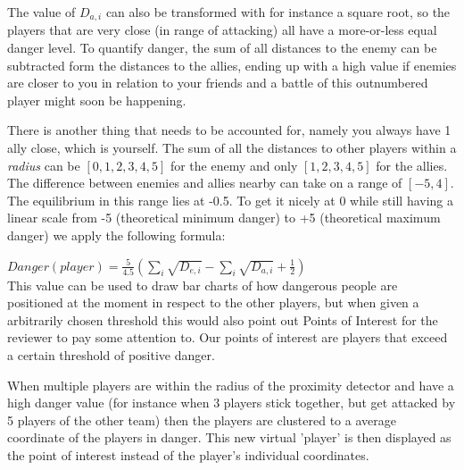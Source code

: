 \documentclass[a4paper]{article}
\theoremstyle{plain} %
\theoremstyle{definition} %
\begin{document}
The value of $D_{a,i}$ can also be transformed with for instance a square root, so the players that are very close (in range of attacking) all have a more-or-less equal danger level. To quantify danger, the sum of all distances to the enemy can be subtracted form the distances to the allies, ending up with a high value if enemies are closer to you in relation to your friends and a battle of this outnumbered player might soon be happening.

There is another thing that needs to be accounted for, namely you always have 1 ally close, which is yourself. The sum of all the distances to other players  within a \emph{radius} can be $[0,1,2,3,4,5]$ for the enemy and only $[1,2,3,4,5]$ for the allies. The difference between enemies and allies nearby can take on a range of $[-5,4]$. The equilibrium in this range lies at -0.5. To get it nicely at 0 while still having a linear scale from -5 (theoretical minimum danger) to +5 (theoretical maximum danger) we apply the following formula:

$Danger(player) = \frac{5}{4.5}(\sum_i{\sqrt{D_{e,i}}}-\sum_i{\sqrt{D_{a,i}}}+\frac{1}{2})$\\

This value can be used to draw bar charts of how dangerous people are positioned at the moment in respect to the other players, but when given a arbitrarily chosen threshold this would also point out Points of Interest for the reviewer to pay some attention to. Our points of interest are players that exceed a certain threshold of positive danger. 

When multiple players are within the radius of the proximity detector and have a high danger value (for instance when 3 players stick together, but get attacked by 5 players of the other team) then the players are clustered to a average coordinate of the players in danger. This new virtual 'player' is then displayed as the point of interest instead of the player's individual coordinates.

\newpage
\end{document}
